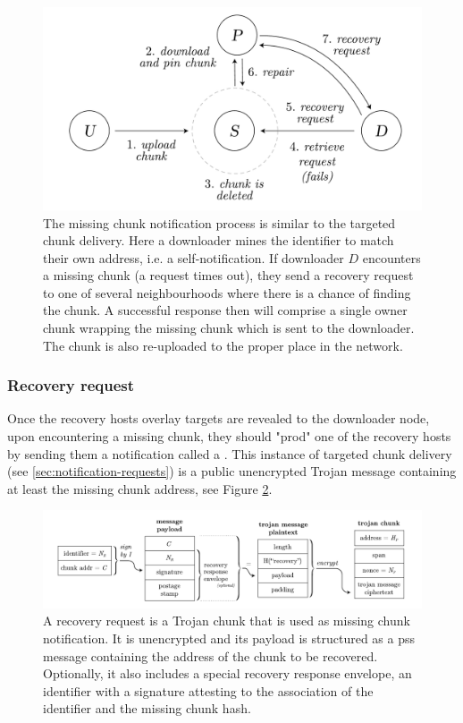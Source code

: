 \begin{figure}[htbp]
\centering
\includegraphics[width=.8\textwidth]{fig/missing-chunk-notification.pdf} \caption[Missing chunk notification process \statusgreen]{The missing chunk notification process is similar to the targeted chunk delivery. Here a downloader mines the identifier to match their own address, i.e. a self-notification. If downloader $D$ encounters a missing chunk (a request times out), they send a recovery request to one of several neighbourhoods where there is a chance of finding the chunk. A successful response then will comprise a single owner chunk wrapping the missing chunk which is sent to the downloader. The chunk is also re-uploaded to the proper place in the network.}
\label{fig:missing-chunk-notification}
\end{figure}

\subsubsection{Recovery request}

Once the recovery hosts overlay targets are revealed to the downloader node, upon encountering a missing chunk, they should "prod" one of the recovery hosts by sending them a notification called a . This instance of targeted chunk delivery (see \ref{sec:notification-requests}) is a public unencrypted Trojan message containing at least the missing chunk address, see Figure \ref{fig:recovery-request}.

\begin{figure}[htbp]
  \centering
  \includegraphics[width=\textwidth]{fig/recovery-request.pdf}
  \caption[Recovery request \statusgreen]{A recovery request is a Trojan chunk that is used as missing chunk notification. It is unencrypted and its payload is structured as a pss message containing the address of the chunk to be recovered. Optionally, it also includes a special recovery response envelope, an identifier with a signature attesting to the association of the identifier and the missing chunk hash.}
  \label{fig:recovery-request}
\end{figure}

